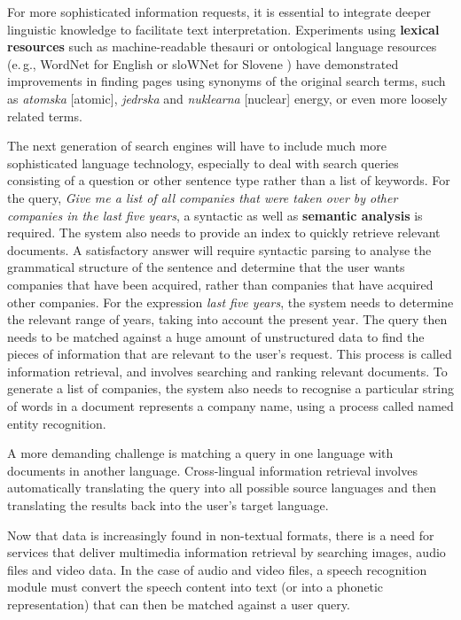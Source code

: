 \begin{multicols}{2}
For more sophisticated information requests, it is essential to integrate deeper linguistic knowledge to facilitate text interpretation. Experiments using \textbf{lexical resources} such as machine-readable thesauri or ontological language resources (e.\,g., WordNet for English or sloWNet for Slovene \cite{slownet1}) have demonstrated improvements in finding pages using synonyms of the original search terms, such as \textit{atomska} {[}atomic{]}, \textit{jedrska} and \textit{nuklearna} {[}nuclear{]} energy, or even more loosely related terms.


The next generation of search engines will have to include much more sophisticated language technology, especially to deal with search queries consisting of a question or other sentence type rather than a list of keywords. For the query, \textit{Give me a list of all companies that were taken over by other companies in the last five years}, a syntactic as well as \textbf{semantic analysis} is required. The system also needs to provide an index to quickly retrieve relevant documents. A satisfactory answer will require syntactic parsing to analyse the grammatical structure of the sentence and determine that the user wants companies that have been acquired, rather than companies that have acquired other companies. For the expression \textit{last five years}, the system needs to determine the relevant range of years, taking into account the present year. The query then needs to be matched against a huge amount of unstructured data to find the pieces of information that are relevant to the user’s request. This process is called information retrieval, and involves searching and ranking relevant documents. To generate a list of companies, the system also needs to recognise a particular string of words in a document represents a company name, using a process called named entity recognition.

A more demanding challenge is matching a query in one language with documents in another language. Cross-lingual information retrieval involves automatically translating the query into all possible source languages and then translating the results back into the user's target language.

Now that data is increasingly found in non-textual formats, there is a need for services that deliver multimedia information retrieval by searching images, audio files and video data. In the case of audio and video files, a speech recognition module must convert the speech content into text (or into a phonetic representation) that can then be matched against a user query.


\end{multicols}
